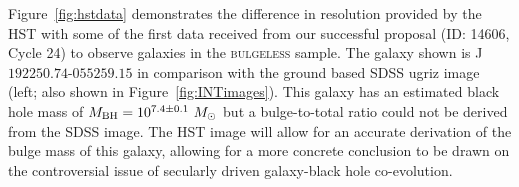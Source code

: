 Figure~\ref{fig:hstdata} demonstrates the difference in resolution provided by the HST with some of the first data received from our successful proposal (ID: 14606, Cycle 24) to observe galaxies in the \textsc{bulgeless} sample. The galaxy shown is J$192250.74$-$055259.15$ in comparison with the ground based SDSS ugriz image (left; also shown in Figure~\ref{fig:INTimages}). This galaxy has an estimated black hole mass of $M_{\rm{BH}} = 10^{7.4\pm0.1}~M_{\odot}$ but a bulge-to-total ratio could not be derived from the SDSS image. The HST image will allow for an accurate derivation of the bulge mass of this galaxy, allowing for a more concrete conclusion to be drawn on the controversial issue of secularly driven galaxy-black hole co-evolution. 

